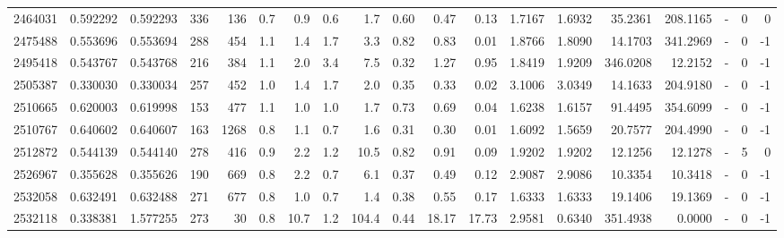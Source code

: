 \begin{tabular}{rrrrrrrrrrrrrrrrlrr}
   2464031 & 0.592292 &   0.592293 &  336 &  136 &      0.7 &      0.9 &     0.6 &      1.7 &       0.60 &        0.47 &        0.13 &  1.7167 &  1.6932 &   35.2361 &  208.1165 &             - &        0 &          0 \\
   2475488 & 0.553696 &   0.553694 &  288 &  454 &      1.1 &      1.4 &     1.7 &      3.3 &       0.82 &        0.83 &        0.01 &  1.8766 &  1.8090 &   14.1703 &  341.2969 &             - &        0 &         -1 \\
   2495418 & 0.543767 &   0.543768 &  216 &  384 &      1.1 &      2.0 &     3.4 &      7.5 &       0.32 &        1.27 &        0.95 &  1.8419 &  1.9209 &  346.0208 &   12.2152 &             - &        0 &         -1 \\
   2505387 & 0.330030 &   0.330034 &  257 &  452 &      1.0 &      1.4 &     1.7 &      2.0 &       0.35 &        0.33 &        0.02 &  3.1006 &  3.0349 &   14.1633 &  204.9180 &             - &        0 &         -1 \\
   2510665 & 0.620003 &   0.619998 &  153 &  477 &      1.1 &      1.0 &     1.0 &      1.7 &       0.73 &        0.69 &        0.04 &  1.6238 &  1.6157 &   91.4495 &  354.6099 &             - &        0 &         -1 \\
   2510767 & 0.640602 &   0.640607 &  163 & 1268 &      0.8 &      1.1 &     0.7 &      1.6 &       0.31 &        0.30 &        0.01 &  1.6092 &  1.5659 &   20.7577 &  204.4990 &             - &        0 &         -1 \\
   2512872 & 0.544139 &   0.544140 &  278 &  416 &      0.9 &      2.2 &     1.2 &     10.5 &       0.82 &        0.91 &        0.09 &  1.9202 &  1.9202 &   12.1256 &   12.1278 &             - &        5 &          0 \\
   2526967 & 0.355628 &   0.355626 &  190 &  669 &      0.8 &      2.2 &     0.7 &      6.1 &       0.37 &        0.49 &        0.12 &  2.9087 &  2.9086 &   10.3354 &   10.3418 &             - &        0 &         -1 \\
   2532058 & 0.632491 &   0.632488 &  271 &  677 &      0.8 &      1.0 &     0.7 &      1.4 &       0.38 &        0.55 &        0.17 &  1.6333 &  1.6333 &   19.1406 &   19.1369 &             - &        0 &         -1 \\
   2532118 & 0.338381 &   1.577255 &  273 &   30 &      0.8 &     10.7 &     1.2 &    104.4 &       0.44 &       18.17 &       17.73 &  2.9581 &  0.6340 &  351.4938 &    0.0000 &             - &        0 &         -1 \\

\end{tabular}
